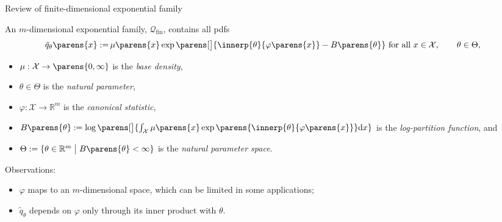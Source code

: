 \documentclass[aspectratio=169,xcolor=dvipsnames]{beamer}
\begin{document}
\begin{frame}{Review of finite-dimensional exponential family}
	
	An $m$-dimensional exponential family, 
	$\mathcal{Q}_{\mathrm{fin}}$, contains all pdfs %
	\begin{align}
		\tilde{q}_{\theta} \parens{x} := & \, \mu \parens{x} \exp \parens[\big]{ \innerp{\theta}{\varphi \parens{x}}
		- B \parens{\theta}} \text{ for all } x \in \mathcal{X}, \qquad \theta \in \Theta, 
	\end{align}
	\vspace{-15pt}
	\begin{itemize}
		\item $\mu: \mathcal{X} \to \parens{0, \infty}$ is the \textit{base density}, 
		\item $\theta \in \Theta$ is the \textit{natural parameter}, 
		\item $\varphi: \mathcal{X} \to \mathbb{R}^m$ is the \textit{canonical statistic}, %
		\item $B \parens{\theta} := \log \parens[\big]{\int_{\mathcal{X}} \mu \parens{x} \exp \parens{\innerp{\theta}{\varphi \parens{x}}} \mathrm{d} x}$ is the \textit{log-partition function}, and 
		\item $\Theta := \{\theta \in \mathbb{R}^m \bigm| B \parens{\theta} < \infty \}$ is the \textit{natural parameter space}. 
	\end{itemize}
	
	\vspace{10pt}
	
	{\color{defaultcolor}Observations:}
	\begin{itemize}
		\item $\varphi$ maps to an $m$-dimensional space, which can be limited in some applications; 
		\item $\tilde{q}_{\theta}$ depends on $\varphi$ only through its inner product with $\theta$. 
	\end{itemize}
	
		
	
\end{frame}
\end{document}
